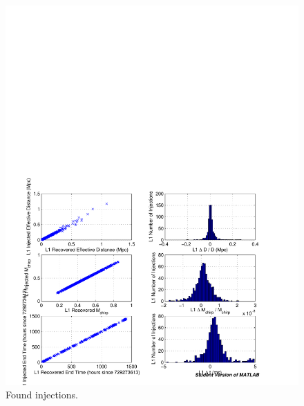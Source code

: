 \begin{figure}[p]
\begin{center}
\includegraphics[width=\textwidth]{analysis/figures/l1_param_error}
\end{center}
\caption{\label{f:l1_param_error}%
Found injections.
}
\end{figure}

